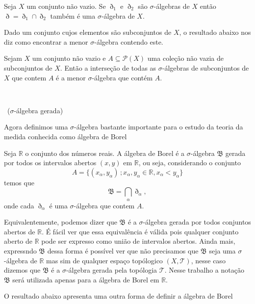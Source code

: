 \documentclass[a4paper, 11pt]{book}
\theoremstyle{definition}
\newcommand{\obs}{\noindent{\textbf{\textcolor{black}{\sffamily Observação:}}}~}
\newcommand{\bR}{\mathbb{R}}
\newcommand{\cB}{\mathfrak{B}}
\newcommand{\cT}{\mathcal{T}}
\begin{document}
\begin{ex}
    Seja $X$ um conjunto não vazio. Se $\eth_1$ e $\eth_2$ são $\sigma$-álgebras de $X$ então $\eth = \eth_1 \cap \eth_2$ também é uma $\sigma$-álgebra de $X$.
\end{ex}

Dado um conjunto cujos elementos são subconjuntos de $X$, o resultado abaixo nos diz como encontrar a menor $\sigma$-álgebra contendo este.

\begin{pbox}
    Sejam $X$ um conjunto não vazio e $A \subseteq \mathcal{P}(X)$ uma coleção não vazia de subconjuntos de $X$. Então a interseção de todas as $\sigma$-álgebras de subconjuntos de $X$ que contem $A$ é a menor $\sigma$-álgebra que contém $A$.
\end{pbox}
\begin{prf}
    ~
\end{prf}

\obs ($\sigma$-álgebra gerada)

Agora definimos uma $\sigma$-álgebra bastante importante para o estudo da teoria da medida conhecida como álgebra de Borel

\begin{dbox}
    Seja $\bR$ o conjunto dos números reais. A álgebra de Borel é a $\sigma$-álgebra $\cB$ gerada por todos os intervalos abertos $(x,y)$ em $\bR$, ou seja, considerando o conjunto
    \[
        A = \{(x_\alpha, y_\alpha) \,; x_\alpha, y_\alpha \in \bR, x_\alpha < y_\alpha\}  
    \]
    temos que
    \[
        \cB = \bigcap_\alpha \eth_\alpha,
    \]
    onde cada $\eth_\alpha$ é uma $\sigma$-álgebra que contem $A$.
\end{dbox}

Equivalentemente, podemos dizer que $\cB$ é a $\sigma$-álgebra gerada por todos conjuntos abertos de $\bR$.
É fácil ver que essa equivalência é válida pois qualquer conjunto aberto de $\bR$ pode ser expresso como união de intervalos abertos. 
Ainda mais, expressndo $\cB$ dessa forma é possível ver que não precisamos que $\cB$ seja uma $\sigma$-álgebra de $\bR$ mas sim de qualquer espaço topólogico $(X,\cT)$, nesse caso dizemos que $\cB$ é a $\sigma$-álgebra gerada pela topólogia $\cT$.
Nesse trabalho a notação $\cB$ será utilizada apenas para a álgebra de Borel em $\bR$.

O resultado abaixo apresenta uma outra forma de definir a álgebra de Borel
\end{document}
